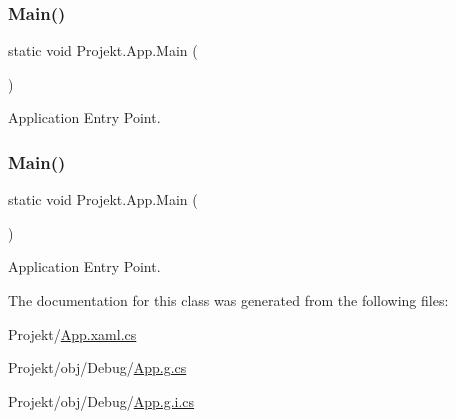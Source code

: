 \subsubsection{\texorpdfstring{Main()}{Main()}\hspace{0.1cm}{\footnotesize\ttfamily [1/2]}}
{\footnotesize\ttfamily static void Projekt.\+App.\+Main (\begin{DoxyParamCaption}{ }\end{DoxyParamCaption})\hspace{0.3cm}{\ttfamily [static]}}



Application Entry Point. 

\mbox{\label{class_projekt_1_1_app_a35398757aacd40ab369960c883a72b5e}} 
\subsubsection{\texorpdfstring{Main()}{Main()}\hspace{0.1cm}{\footnotesize\ttfamily [2/2]}}
{\footnotesize\ttfamily static void Projekt.\+App.\+Main (\begin{DoxyParamCaption}{ }\end{DoxyParamCaption})\hspace{0.3cm}{\ttfamily [static]}}



Application Entry Point. 



The documentation for this class was generated from the following files\+:\begin{DoxyCompactItemize}
\item 
Projekt/\mbox{\hyperlink{_app_8xaml_8cs}{App.\+xaml.\+cs}}\item 
Projekt/obj/\+Debug/\mbox{\hyperlink{_app_8g_8cs}{App.\+g.\+cs}}\item 
Projekt/obj/\+Debug/\mbox{\hyperlink{_app_8g_8i_8cs}{App.\+g.\+i.\+cs}}\end{DoxyCompactItemize}
